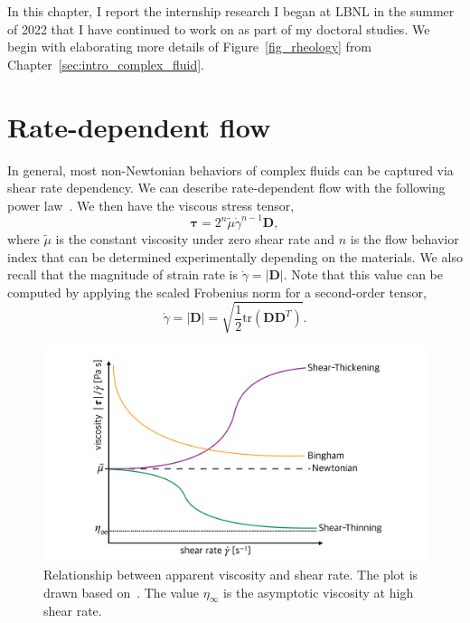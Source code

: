 \par
In this chapter, I report the internship research I began at LBNL in the summer of 2022 that I have continued to work on as part of my doctoral studies.
We begin with elaborating more details of Figure~\ref{fig_rheology} from Chapter~\ref{sec:intro_complex_fluid}. 

\section{Rate-dependent flow}
In general, most non-Newtonian behaviors of complex fluids can be captured via shear rate dependency. 
We can describe rate-dependent flow with the following power law~\cite{herschel_konsistenzmessungen_1926}. We then have the viscous stress tensor, 
\begin{equation}
  {\bm \tau}
  =2^n \tilde{\mu} \dot{\gamma} ^{n-1} {\bm D},
  \label{eq_HS_tau}
  \end{equation}
where $\tilde{\mu}$ is the constant viscosity under zero shear rate and $n$ is the flow behavior index that can be determined experimentally depending on the materials.
We also recall that the magnitude of strain rate is $\dot{\gamma} = |\bm{D}|$.
Note that this value can be computed by applying the scaled Frobenius norm for a second-order tensor, 
\[
  \dot{\gamma}  = |\bm{D}| = \sqrt{\frac{1}{2}
    \text{tr}\left(\bm{D} \bm{D}^{T} \right)}.
\]
\begin{figure}[ht]
  \begin{center}
    \includegraphics[scale=0.19]{figures/fig_appr_viscosity.pdf}
    \end{center}
  \caption{Relationship between apparent viscosity and shear rate. The plot is drawn based on~\cite{irgens_rheology_2014}. The value $\eta_{\infty}$ is the asymptotic viscosity at high shear rate.}
  \label{fig_appr_viscosity}
\end{figure}
